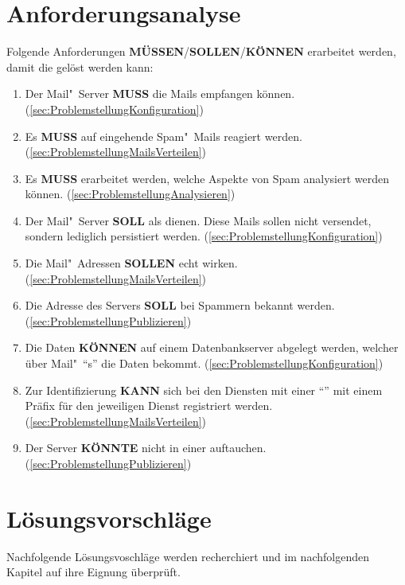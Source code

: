 \documentclass[a4paper,11pt,singlespacing]{article}
\begin{document}
\newpage
\section{Anforderungsanalyse}\label{sec:Anforderungsanalyse}
	Folgende Anforderungen \textbf{MÜSSEN}/\textbf{SOLLEN}/\textbf{KÖNNEN} erarbeitet werden, damit die  gelöst werden kann:

	\begin{enumerate}
	\item
		Der Mail"~Server \textbf{MUSS} die Mails empfangen können.
		(\ref{sec:ProblemstellungKonfiguration})
	\item
		Es \textbf{MUSS} auf eingehende Spam"~Mails reagiert werden.
		(\ref{sec:ProblemstellungMailsVerteilen})
	\item
		Es \textbf{MUSS} erarbeitet werden, welche Aspekte von Spam analysiert werden können.
		(\ref{sec:ProblemstellungAnalysieren})
	\item
		Der Mail"~Server \textbf{SOLL} als  dienen.
		Diese Mails sollen nicht versendet, sondern lediglich persistiert werden.
		(\ref{sec:ProblemstellungKonfiguration})
	\item
		Die Mail"~Adressen \textbf{SOLLEN} echt wirken.
		(\ref{sec:ProblemstellungMailsVerteilen})
	\item
		Die Adresse des  Servers \textbf{SOLL} bei Spammern bekannt werden.
		(\ref{sec:ProblemstellungPublizieren})
	\item
		Die Daten \textbf{KÖNNEN} auf einem Datenbankserver abgelegt werden, welcher über Mail"~"`s"' die Daten bekommt.
		(\ref{sec:ProblemstellungKonfiguration})
	\item
		Zur Identifizierung \textbf{KANN} sich bei den Diensten mit einer "`"' mit einem Präfix für den jeweiligen Dienst registriert werden.
		(\ref{sec:ProblemstellungMailsVerteilen})
	\item
		Der Server \textbf{KÖNNTE} nicht in einer   auftauchen.
		(\ref{sec:ProblemstellungPublizieren})
	\end{enumerate}


\newpage
\section{Lösungsvorschläge}\label{sec:Lösungsvorschläge}
	Nachfolgende Lösungsvoschläge werden recherchiert und im nachfolgenden Kapitel auf ihre Eignung überprüft.
\end{document}
